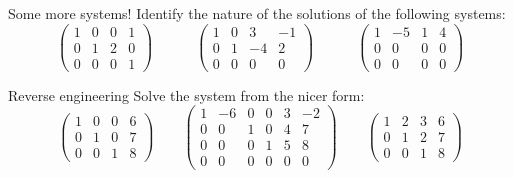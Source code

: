 \documentclass[11pt]{beamer}
\theoremstyle{plain}
\begin{document}
\begin{frame}{Some more systems!}
Identify the nature of the solutions of the following systems: 
    $$
    \left(\begin{array}{ccc|c}
         1 & 0 & 0 & 1 \\
         0 & 1 & 2 & 0 \\
         0 & 0 & 0 & 1
    \end{array}\right)\qquad\quad \left(\begin{array}{ccc|c}
         1 & 0 & 3 & -1 \\
         0 & 1 & -4 & 2 \\
         0 & 0 & 0 & 0
    \end{array}\right)\qquad\quad 
    \left(\begin{array}{ccc|c}
         1 & -5 & 1 & 4 \\
         0 & 0 & 0 & 0 \\
         0 & 0 & 0 & 0
    \end{array}\right)
    $$
\end{frame}


\begin{frame}{Reverse engineering}
    Solve the system from the nicer form:
    $$
    \left(\begin{array}{ccc|c}
         1 & 0 & 0 & 6 \\
         0 & 1 & 0 & 7 \\
         0 & 0 & 1 & 8
    \end{array}\right)\qquad
    \left(\begin{array}{ccccc|c}
        1 & -6 & 0 &0&3&-2 \\
        0 & 0 & 1 &0&4&7 \\
        0 & 0 & 0 &1 &5 &8 \\
        0 & 0 & 0 & 0 & 0& 0
    \end{array}\right)\qquad
    \left(\begin{array}{ccc|c}
         1 & 2 & 3 & 6 \\
         0 & 1 & 2 & 7 \\
         0 & 0 & 1 & 8
    \end{array}\right)
    $$
\end{frame}
\end{document}

